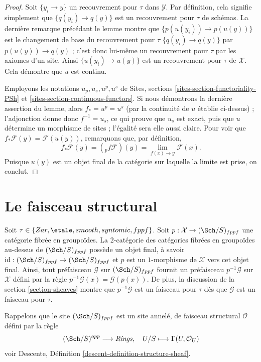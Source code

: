 \begin{proof}
Soit $\{y_i \to y\}$ un recouvrement pour $\tau$ dans $\mathcal{Y}$. Par définition,
cela signifie simplement que $\{q(y_i) \to q(y)\}$ est un recouvrement pour $\tau$ de
schémas. La dernière remarque précédant le lemme montre que
$\{p(u(y_i)) \to p(u(y))\}$ est le changement de base du recouvrement pour $\tau$
$\{q(y_i) \to q(y)\}$ par $p(u(y)) \to q(y)$ ; c'est donc lui-même un
recouvrement pour $\tau$ par les axiomes d'un site. Ainsi $\{u(y_i) \to u(y)\}$
est un recouvrement pour $\tau$ de $\mathcal{X}$. Cela démontre que $u$ est
continu.

\medskip\noindent
Employons les notations $u_p, u_s, u^p, u^s$ de
Sites, sections \ref{sites-section-functoriality-PSh} et
\ref{sites-section-continuous-functors}.
Si nous démontrons la dernière assertion du lemme, alors
$f_* = u^p = u^s$ (par la continuité de $u$ établie ci-dessus) ; l'adjonction donne donc
$f^{-1} = u_s$, ce qui prouve que $u_s$ est exact, puis que $u$ détermine
un morphisme de sites ; l'égalité sera elle aussi claire.
Pour voir que $f_*\mathcal{F}(y) = \mathcal{F}(u(y))$, remarquons que, par
définition,
$$
f_*\mathcal{F}(y) = ({}_pf\mathcal{F})(y) =
\lim_{f(x) \to y} \mathcal{F}(x).
$$
Puisque $u(y)$ est un objet final de la catégorie sur laquelle la limite est
prise, on conclut.
\end{proof}





\section{Le faisceau structural}
\label{section-structure-sheaf}

\noindent
Soit $\tau \in \{Zar, \etale, smooth, syntomic, fppf\}$.
Soit $p : \mathcal{X} \to (\Sch/S)_{fppf}$ une catégorie
fibrée en groupoïdes. La 2-catégorie des catégories fibrées en groupoïdes au-dessus de
$(\Sch/S)_{fppf}$ possède un objet final, à savoir
$\text{id} : (\Sch/S)_{fppf} \to (\Sch/S)_{fppf}$
et $p$ est un $1$-morphisme de $\mathcal{X}$ vers cet objet final.
Ainsi, tout préfaisceau $\mathcal{G}$ sur $(\Sch/S)_{fppf}$ fournit un
préfaisceau $p^{-1}\mathcal{G}$ sur $\mathcal{X}$ défini par la règle
$p^{-1}\mathcal{G}(x) = \mathcal{G}(p(x))$. De plus, la discussion de la
section \ref{section-sheaves}
montre que $p^{-1}\mathcal{G}$ est un faisceau pour $\tau$ dès que
$\mathcal{G}$ est un faisceau pour $\tau$.

\medskip\noindent
Rappelons que le site $(\Sch/S)_{fppf}$ est un site annelé,
de faisceau structural $\mathcal{O}$ défini par la règle
$$
(\Sch/S)^{opp} \longrightarrow \textit{Rings},
\quad
U/S \longmapsto \Gamma(U, \mathcal{O}_U)
$$
voir
Descente, Définition \ref{descent-definition-structure-sheaf}.


